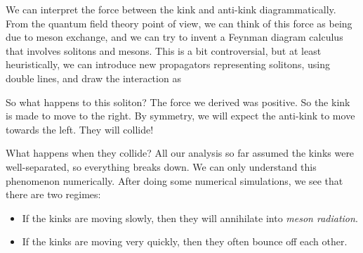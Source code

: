 \documentclass[a4paper]{article}
\begin{document}
We can interpret the force between the kink and anti-kink diagrammatically. From the quantum field theory point of view, we can think of this force as being due to meson exchange, and we can try to invent a Feynman diagram calculus that involves solitons and mesons. This is a bit controversial, but at least heuristically, we can introduce new propagators representing solitons, using double lines, and draw the interaction as
\begin{center}
\end{center}
%

So what happens to this soliton? The force we derived was positive. So the kink is made to move to the right. By symmetry, we will expect the anti-kink to move towards the left. They will collide!

What happens when they collide? All our analysis so far assumed the kinks were well-separated, so everything breaks down. We can only understand this phenomenon numerically. After doing some numerical simulations, we see that there are two regimes:
\begin{itemize}
  \item If the kinks are moving slowly, then they will annihilate into \emph{meson radiation}.
  \item If the kinks are moving very quickly, then they often bounce off each other.
\end{itemize}
%
\end{document}
